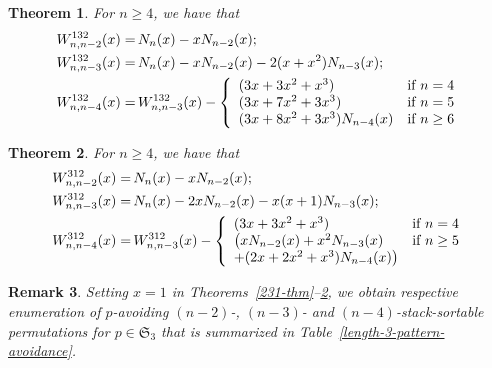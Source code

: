 \documentclass[11pt]{article}
\newtheorem{thm}{Theorem}
\newtheorem{rem}[thm]{Remark}
\newcommand{\+}{\mbox{\ensuremath{\scriptstyle{+}}}}
\begin{document}
\begin{thm}\label{132-thm} For $n\ge 4$, we have that
	\begin{align}
		W^{132}_{n,n-2}(x) = &
		\,   N_{n}(x)  - xN_{n-2}(x); \notag                     \\
		W^{132}_{n,n-3}(x) = &
		\,  N_{n}(x) - xN_{n-2}(x)  - 2(x+x^2)N_{n-3}(x); \notag \\
		W^{132}_{n,n-4}(x) = &
		\,   W^{132}_{n,n-3}(x)  -
		\left\{
		\begin{array}{ll}
			(3x+3x^2+x^3)            & \mbox{if }n=4     \\
			(3x+7x^2+3x^3)           & \mbox{if }n=5     \\
			(3x+8x^2+3x^3)N_{n-4}(x) & \mbox{if }n\geq 6
		\end{array}
		\right. \notag
	\end{align}
\end{thm}

\begin{thm}\label{312-thm} For $n\ge 4$, we have that
	\begin{align}
		W^{312}_{n,n-2}(x) = &
		\,   N_{n}(x)  - xN_{n-2}(x); \notag                  \\
		W^{312}_{n,n-3}(x) = &
		\,  N_{n}(x)  - 2xN_{n-2}(x)-x(x+1)N_{n-3}(x); \notag \\
		W^{312}_{n,n-4}(x) = &
		\,   W^{312}_{n,n-3}(x)  - 	\left\{\begin{array}{ll}
			                                   (3x+3x^2+x^3)                     & \mbox{if }n=4     \\
			                                   \big( xN_{n-2}(x)+ x^2 N_{n-3}(x) & \mbox{if }n\geq 5 \\  + (2x+2x^2+x^3) N_{n-4}(x)  \big)  &\end{array}\right. \notag
	\end{align}
\end{thm}

\begin{rem} Setting $x=1$ in Theorems~\ref{231-thm}--\ref{312-thm}, we obtain respective enumeration of $p$-avoiding $(n-2)$-, $(n-3)$- and $(n-4)$-stack-sortable permutations for $p\in\mathfrak{S}_3$ that is summarized in Table~\ref{length-3-pattern-avoidance}. \end{rem}
\end{document}
